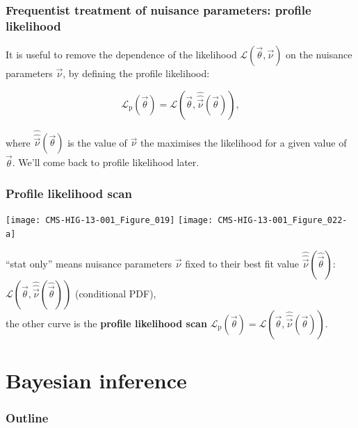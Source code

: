 \documentclass[9pt]{beamer}
\newif\ifmyhide
\newcommand\myhide[1]{%
\ifmyhide \vspace{15pt} \begin{center} \myexample{(blackboard)}\end{center} \vspace{15pt} \else #1 \fi
}
\begin{document}
\begin{frame}
 \frametitle{Frequentist treatment of nuisance parameters: profile likelihood}
 
 It is useful to remove the dependence of the likelihood $\mathcal{L}(\vec{\theta},\vec{\nu})$ on the nuisance parameters $\vec{\nu}$, by defining the profile likelihood:
 
 \myhide{$$\mathcal{L}_\text{p}(\vec{\theta}) = \mathcal{L}(\vec{\theta},\hat{\hat{\vec{\nu}}}(\vec{\theta})),$$}
 
 where $\hat{\hat{\vec{\nu}}}(\vec{\theta})$ is the value of $\vec{\nu}$
 the maximises the likelihood for a given value of $\vec{\theta}$. We'll come back to profile likelihood later.
\end{frame}

\begin{frame}
 \frametitle{Profile likelihood scan}
 
 \begin{center}
 \texttt{[image: CMS-HIG-13-001\_Figure\_019]}\hfill
  \texttt{[image: CMS-HIG-13-001\_Figure\_022-a]}
 \end{center}
 
 ``stat only'' means nuisance parameters $\vec{\nu}$ fixed to their best fit value $\hat{\hat{\vec{\nu}}}(\hat{\vec{\theta}})$: $\mathcal{L}(\vec{\theta},\hat{\hat{\vec{\nu}}}(\hat{\vec{\theta}}))$ (conditional PDF),\\
 the other curve is the \textbf{profile likelihood scan} $\mathcal{L}_\text{p}(\vec{\theta}) = \mathcal{L}(\vec{\theta},\hat{\hat{\vec{\nu}}}(\vec{\theta}))$.

\end{frame}


\section{Bayesian inference}

\begin{frame}
 \frametitle{Outline}
 
 \tableofcontents[current]
\end{frame}
\end{document}
